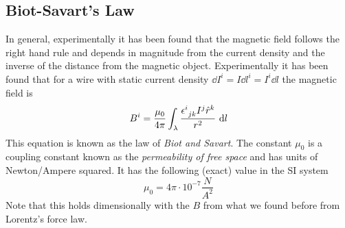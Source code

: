 \documentclass[../electromagnetism]{subfiles}
\begin{document}
\subsection{Biot-Savart's Law}
In general, experimentally it has been found that the magnetic field follows the right hand rule and depends in magnitude from the current density and the inverse of the distance from the magnetic object. Experimentally it has been found that for a wire with static current density $\dd I^i=I\dd l^i=I^i\dd l$ the magnetic field is
\begin{equation}
	B^i=\frac{\mu_0}{4\pi}\int_\lambda\frac{\epsilon^{i}_{\ jk}I^j\hat{r}^k}{r^2}\ \mathrm{d} l
	\label{eq:biotsavart}
\end{equation}
This equation is known as the law of \textit{Biot and Savart}. The constant $\mu_0$ is a coupling constant known as the \textit{permeability of free space} and has units of Newton/Ampere squared. It has the following (exact) value in the SI system
\begin{equation}
	\mu_0=4\pi\cdot10^{-7}\unit{\frac{N}{A^2}}
	\label{eq:munot}
\end{equation}
Note that this holds dimensionally with the $B$ from what we found before from Lorentz's force law.
\end{document}
